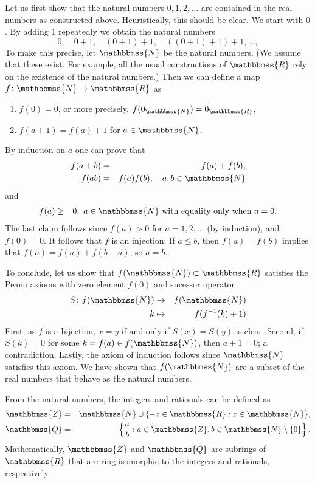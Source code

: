 \documentclass[12pt]{article}
\newcommand{\Z}{\mathbbmss{Z}}
\newcommand{\N}{\mathbbmss{N}}
\newcommand{\R}{\mathbbmss{R}}
\newcommand{\Q}{\mathbbmss{Q}}
\begin{document}
Let us first show that the natural numbers $0,1,2,\ldots$ are 
contained in the real numbers as constructed above. 
Heuristically, this should be clear. We start with $0$. 
By adding $1$ repeatedly we obtain the natural numbers
$$
  0, \quad 0+1, \quad (0+1)+1, \quad ((0+1)+1)+1, \ldots,
$$
To make this precise, let $\N$ be the natural numbers.
(We assume that these exist. For example, all the usual constructions
of $\R$ rely on the existence of the natural numbers.)
Then we can define a map $f\colon \N\to \R$ as
\begin{enumerate}
\item $f(0)=0$, or more precisely, $f(0_\N)=0_\R$,
\item $f(a+1)=f(a)+1$ for $a\in \N$.
\end{enumerate}
By induction on $a$ one can prove that
\begin{eqnarray*}
  f(a + b) &=&  f(a) + f(b), \\
  f(a b)   &=&  f(a) f(b), \quad a,b\in \N
\end{eqnarray*}
and
\begin{eqnarray*}
  f(a) &\ge & 0, \ a\in \N\ \mbox{with equality only when}\ a=0.
\end{eqnarray*}
The last claim follows since $f(a)>0$ for $a=1,2,\ldots$ (by induction), 
and $f(0)=0$. 
It follows that $f$ is an injection: If $a\le b$, then $f(a)=f(b)$ implies
that $f(a)=f(a)+f(b-a)$, so $a=b$. 

To conclude, let us show that
$f(\N)\subset\R$ satisfies the Peano axioms with zero element $f(0)$ and
sucessor operator 
\begin{eqnarray*}
S\colon f(\N) &\to& f(\N) \\
        k &\mapsto & f(f^{-1}(k)+1)
\end{eqnarray*}
First, as $f$ is a bijection,  $x=y$ if and only if $S(x)=S(y)$ 
   is clear. 
Second, if $S(k)=0$ for some $k=f(a)\in f(\N)$, then $a+1=0$; a contradiction.
Lastly, the axiom of induction follows since $\N$ satisfies this axiom.
We have shown that $f(\N)$ are a subset of the real numbers that
behave as the natural numbers. 

From the natural numbers, the integers and rationals can
be defined as
\begin{eqnarray*}
  \Z&=& \N\cup \{-z\in \R : z\in \N\}, \\ 
  \Q&=& \left\{ \frac{a}{b} : a\in \Z, b\in \N\setminus\{0\} \right\}.
\end{eqnarray*}
Mathematically, $\Z$ and $\Q$ are subrings of $\R$ that are
ring isomorphic to the integers and rationals, respectively.
\end{document}
